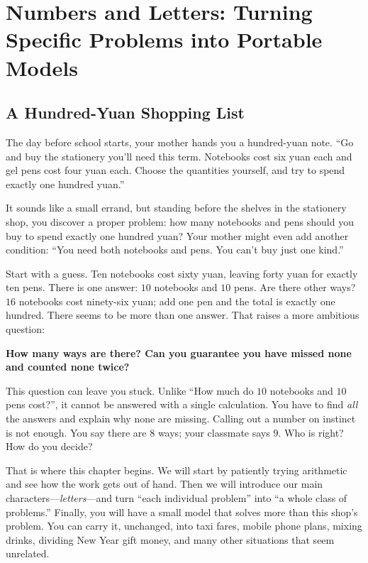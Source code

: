\chapter{Numbers and Letters: Turning Specific Problems into Portable Models}

\section{A Hundred-Yuan Shopping List}

The day before school starts, your mother hands you a hundred-yuan note. ``Go and buy the stationery you'll need this term. Notebooks cost six yuan each and gel pens cost four yuan each. Choose the quantities yourself, and try to spend exactly one hundred yuan.''

It sounds like a small errand, but standing before the shelves in the stationery shop, you discover a proper problem: how many notebooks and pens should you buy to spend exactly one hundred yuan? Your mother might even add another condition: ``You need both notebooks and pens. You can't buy just one kind.''

Start with a guess. Ten notebooks cost sixty yuan, leaving forty yuan for exactly ten pens. There is one answer: $10$ notebooks and $10$ pens. Are there other ways? $16$ notebooks cost ninety-six yuan; add one pen and the total is exactly one hundred. There seems to be more than one answer. That raises a more ambitious question:

\begin{center}
\textbf{How many ways are there? Can you guarantee you have missed none and counted none twice?}
\end{center}

This question can leave you stuck. Unlike ``How much do $10$ notebooks and $10$ pens cost?'', it cannot be answered with a single calculation. You have to find \emph{all} the answers and explain why none are missing. Calling out a number on instinct is not enough. You say there are $8$ ways; your classmate says $9$. Who is right? How do you decide?

That is where this chapter begins. We will start by patiently trying arithmetic and see how the work gets out of hand. Then we will introduce our main characters---\emph{letters}---and turn ``each individual problem'' into ``a whole class of problems.'' Finally, you will have a small model that solves more than this shop's problem. You can carry it, unchanged, into taxi fares, mobile phone plans, mixing drinks, dividing New Year gift money, and many other situations that seem unrelated.

